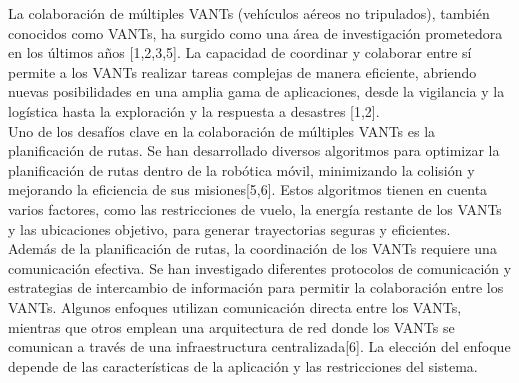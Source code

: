 \documentclass[11pt,epsf,times]{article}
\begin{document}

La colaboraci\'{o}n de m\'{u}ltiples VANTs (veh\'{i}culos a\'{e}reos no tripulados), tambi\'{e}n conocidos como VANTs, ha surgido como una \'{a}rea de investigaci\'{o}n prometedora en los \'{u}ltimos a\~{n}os [1,2,3,5]. La capacidad de coordinar y colaborar entre s\'{i} permite a los VANTs realizar tareas complejas de manera eficiente, abriendo nuevas posibilidades en una amplia gama de aplicaciones, desde la vigilancia y la log\'{i}stica hasta la exploraci\'{o}n y la respuesta a desastres [1,2].\\

Uno de los desaf\'{i}os clave en la colaboraci\'{o}n de m\'{u}ltiples VANTs es la planificaci\'{o}n de rutas. Se han desarrollado diversos algoritmos para optimizar la planificaci\'{o}n de rutas dentro de la rob\'{o}tica m\'{o}vil, minimizando la colisi\'{o}n y mejorando la eficiencia de sus misiones[5,6]. Estos algoritmos tienen en cuenta varios factores, como las restricciones de vuelo, la energ\'{i}a restante de los VANTs y las ubicaciones objetivo, para generar trayectorias seguras y eficientes.\\

Adem\'{a}s de la planificaci\'{o}n de rutas, la coordinaci\'{o}n de los VANTs requiere una comunicaci\'{o}n efectiva. Se han investigado diferentes protocolos de comunicaci\'{o}n y estrategias de intercambio de informaci\'{o}n para permitir la colaboraci\'{o}n entre los VANTs. Algunos enfoques utilizan comunicaci\'{o}n directa entre los VANTs, mientras que otros emplean una arquitectura de red donde los VANTs se comunican a trav\'{e}s de una infraestructura centralizada[6]. La elecci\'{o}n del enfoque depende de las caracter\'{i}sticas de la aplicaci\'{o}n y las restricciones del sistema.\\

\end{document}
